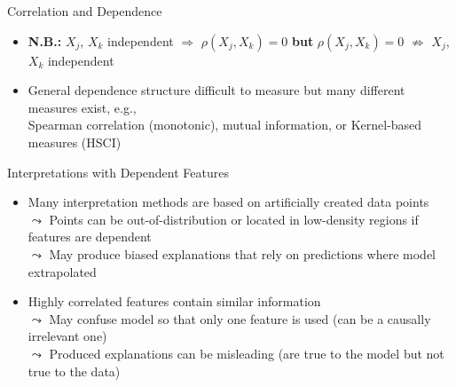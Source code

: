 \documentclass[11pt,compress,t,notes=noshow, aspectratio=169, xcolor=table]{beamer}
\begin{document}
\begin{frame}{Correlation and Dependence}
\begin{itemize}
\pause
\item \textbf{N.B.:} $X_j$, $X_k$ independent $\Rightarrow$ $\rho(X_j, X_k) = 0$ \textbf{but} $\rho(X_j, X_k) = 0$ $\nRightarrow$ $X_j$, $X_k$  independent
\item General dependence structure difficult to measure but many different measures exist, e.g., \\
Spearman correlation (monotonic), mutual information, or Kernel-based measures (HSCI)
\end{itemize}


\end{frame}



\begin{frame}{Interpretations with Dependent Features}
\begin{itemize}
\item Many interpretation methods are based on 
artificially created data points \\
$\leadsto$ Points can be out-of-distribution or located in low-density regions if features are dependent\\
$\leadsto$ May produce biased explanations that rely on predictions where model extrapolated\\
\pause
\item Highly correlated features contain similar information \\
$\leadsto$ May confuse model so that only one feature is used (can be a causally irrelevant one)
\\
$\leadsto$ Produced explanations can be misleading (are true to the model but not true to the data) %
\\

\end{itemize}
\end{frame}
\end{document}
